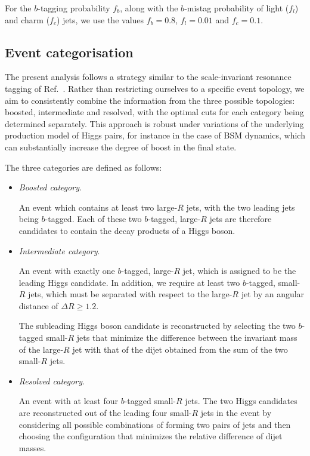 For the $b$-tagging probability $f_b$, along with
the $b$-mistag probability of light ($f_l$) and charm ($f_c$) jets,
we use the values $f_b=0.8$, $f_l=0.01$
and  $f_c=0.1$.


\subsection{Event categorisation}
\label{sec:categorisation}

The present analysis follows a strategy similar to the
scale-invariant resonance tagging of Ref.~\cite{Gouzevitch:2013qca}.
%
Rather than restricting ourselves to a specific event topology,
we aim to consistently combine the information from
the three possible topologies: boosted, intermediate and
resolved, with the optimal cuts for each category being determined
separately.
%
This approach is robust
under variations of
the underlying production model of Higgs pairs,
for instance in the case of
BSM dynamics, which can substantially increase
the degree of boost in the final state.


The three categories are defined as follows:
\begin{itemize}
\item {\it Boosted category}.

  An event which
  contains at least two large-$R$ jets, with the two leading jets
 being $b$-tagged.
 Each of these two  $b$-tagged, large-$R$ jets are 
 therefore candidates
 to contain the decay products of a Higgs boson.

\item {\it Intermediate category}.

  An event with exactly one  $b$-tagged, large-$R$ jet, which
  is assigned to be the leading Higgs candidate.
  In addition, we require at least two $b$-tagged, small-$R$ jets,
  which must be separated with respect to the large-$R$ jet
  by an angular distance of $\Delta R\ge 1.2$.
    
  The subleading Higgs boson candidate is reconstructed
  by selecting the two $b$-tagged small-$R$ jets that minimize the difference
  between the invariant mass of the large-$R$ jet
  with that of the dijet obtained
  from the sum of the two small-$R$ jets.
  
\item {\it Resolved category}.

  
 An event with at least
  four $b$-tagged small-$R$ jets.
  The two Higgs candidates are reconstructed out of the
  leading four small-$R$ jets in the event
  by considering all possible combinations of forming two pairs of jets
  and then choosing the configuration that minimizes the relative difference of
  dijet masses.
  
\end{itemize}


